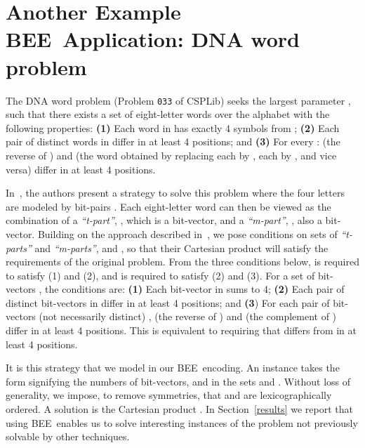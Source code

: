 \documentclass{tlp}
\newcommand{\bee}{\textsf{BEE}}
\begin{document}
\section{Another Example \bee\ Application: 
DNA word problem}

The DNA word problem (Problem \texttt{033} of CSPLib) seeks the
largest parameter , such that there exists a set  of 
eight-letter words over the alphabet  with the
following properties:
\textbf{(1)} Each word in  has exactly 4 symbols from ;
\textbf{(2)} Each pair of distinct words in  differ in at least 4 positions;
and
\textbf{(3)} For every :  (the reverse of ) and  (the
word obtained by replacing each  by , each  by , and vice
versa) differ in at least 4 positions.

In~\cite{dnaWordPaper}, the authors present a strategy to solve this
problem where the four letters are modeled by bit-pairs
. Each eight-letter word can then be viewed as the
combination of a \emph{``t-part''}, , which is
a bit-vector, and a \emph{``m-part''}, , also
a bit-vector. Building on the approach described
in~\cite{dnaWordPaper}, we pose conditions on sets of
\emph{``t-parts''} and \emph{``m-parts''},  and , so that their
Cartesian product  will satisfy the requirements of the
original problem. From the three conditions below,  is required to
satisfy (1) and (2), and  is required to satisfy (2) and
(3).
For a set of bit-vectors , the conditions are:
\textbf{(1)} Each bit-vector in  sums to 4;
\textbf{(2)} Each pair of distinct bit-vectors in  differ in at
  least 4 positions; and
\textbf{(3}) For each pair of bit-vectors (not necessarily distinct)
  ,  (the reverse of ) and  (the complement of
  ) differ in at least 4 positions. This is equivalent to requiring
  that  differs from  in at least 4 positions.


  It is this strategy that we model in our \bee\ encoding.
  An instance takes the form  signifying the
  numbers of bit-vectors,  and  in the sets  and .
Without loss of generality, we impose, to remove symmetries, that
   and  are lexicographically ordered.
A solution is the Cartesian product .
In Section~\ref{results} we report that using \bee\ enables us to
  solve interesting instances of the problem not previously solvable
  by other techniques.
\end{document}
